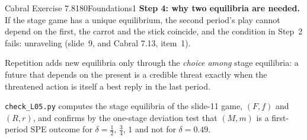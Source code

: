 \begin{exsol}{Cabral Exercise 7.8}{180}{Foundations}{1}
\textbf{Step 4: why two equilibria are needed.} If the stage game has a unique equilibrium, the
second period's play cannot depend on the first, the carrot and the stick coincide, and the
condition in Step~2 fails: unraveling (slide~9, and Cabral 7.13, item~1).

\interp Repetition adds new equilibria only through the \emph{choice among} stage equilibria: a
future that depends on the present is a credible threat exactly when the threatened action is itself
a best reply in the last period.

\verify \texttt{check\_L05.py} computes the stage equilibria of the slide-11 game, $(F,f)$ and
$(R,r)$, and confirms by the one-stage deviation test that $(M,m)$ is a first-period SPE outcome
for $\delta = \frac12$, $\frac34$, $1$ and not for $\delta = 0.49$.

\end{exsol}
